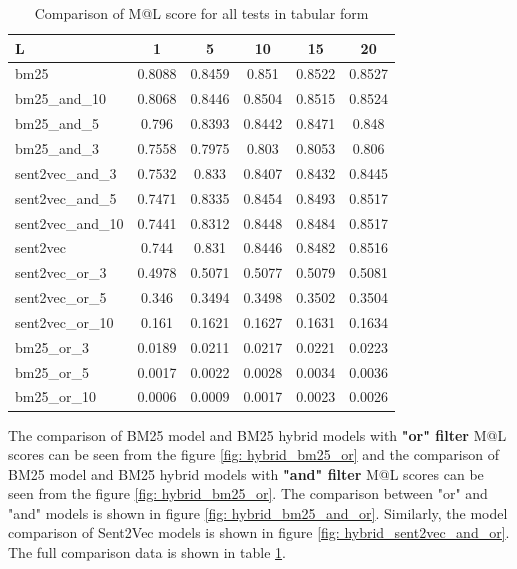 \begin{table}[htbp]
	\centering
	\begin{tabular}{lccccc}
		\toprule
		L     & 1     & 5     & 10    & 15    & 20 \\
		\midrule
		bm25  & 0.8088 & 0.8459 & 0.851 & 0.8522 & 0.8527 \\
		bm25\_and\_10 & 0.8068 & 0.8446 & 0.8504 & 0.8515 & 0.8524 \\
		bm25\_and\_5 & 0.796 & 0.8393 & 0.8442 & 0.8471 & 0.848 \\
		bm25\_and\_3 & 0.7558 & 0.7975 & 0.803 & 0.8053 & 0.806 \\
		sent2vec\_and\_3 & 0.7532 & 0.833 & 0.8407 & 0.8432 & 0.8445 \\
		sent2vec\_and\_5 & 0.7471 & 0.8335 & 0.8454 & 0.8493 & 0.8517 \\
		sent2vec\_and\_10 & 0.7441 & 0.8312 & 0.8448 & 0.8484 & 0.8517 \\
		sent2vec & 0.744 & 0.831 & 0.8446 & 0.8482 & 0.8516 \\
		sent2vec\_or\_3 & 0.4978 & 0.5071 & 0.5077 & 0.5079 & 0.5081 \\
		sent2vec\_or\_5 & 0.346 & 0.3494 & 0.3498 & 0.3502 & 0.3504 \\
		sent2vec\_or\_10 & 0.161 & 0.1621 & 0.1627 & 0.1631 & 0.1634 \\
		bm25\_or\_3 & 0.0189 & 0.0211 & 0.0217 & 0.0221 & 0.0223 \\
		bm25\_or\_5 & 0.0017 & 0.0022 & 0.0028 & 0.0034 & 0.0036 \\
		bm25\_or\_10 & 0.0006 & 0.0009 & 0.0017 & 0.0023 & 0.0026 \\
		\bottomrule
	\end{tabular}%
	\caption{Comparison of M@L score for all tests in tabular form}
	\label{tab: comparison of ml scores of all models}%
\end{table}%


The comparison of BM25 model and BM25 hybrid models with \textbf{"or" filter} M@L scores can be seen from the figure \ref{fig: hybrid_bm25_or} and the comparison of BM25 model and BM25 hybrid models with \textbf{"and" filter} M@L scores can be seen from the figure \ref{fig: hybrid_bm25_or}.
The comparison between "or" and "and" models is shown in figure \ref{fig: hybrid_bm25_and_or}.
Similarly, the model comparison of Sent2Vec models is shown in figure \ref{fig: hybrid_sent2vec_and_or}.			
The full comparison data is shown in table \ref{tab: comparison of ml scores of all models}.

